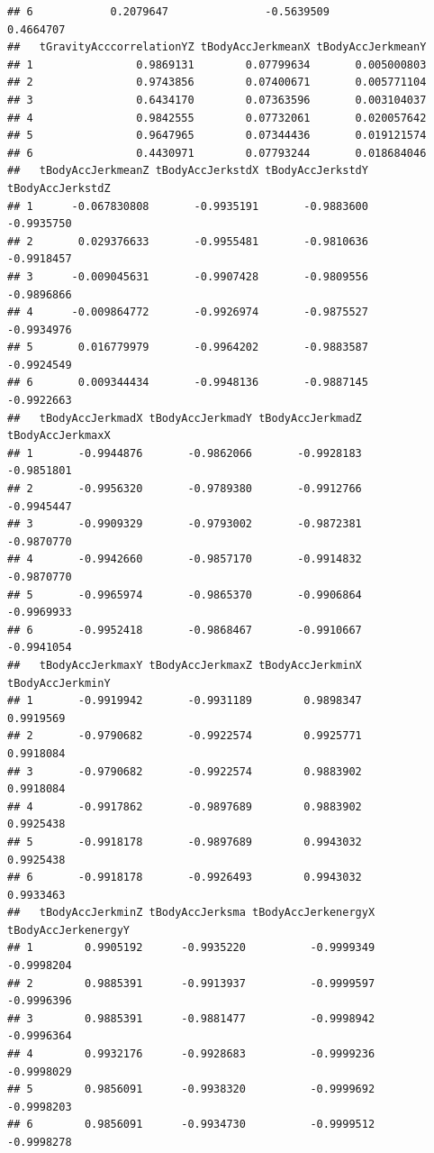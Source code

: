 \documentclass[
]{article}
\begin{document}
\begin{verbatim}
## 6            0.2079647               -0.5639509                0.4664707
##   tGravityAcccorrelationYZ tBodyAccJerkmeanX tBodyAccJerkmeanY
## 1                0.9869131        0.07799634       0.005000803
## 2                0.9743856        0.07400671       0.005771104
## 3                0.6434170        0.07363596       0.003104037
## 4                0.9842555        0.07732061       0.020057642
## 5                0.9647965        0.07344436       0.019121574
## 6                0.4430971        0.07793244       0.018684046
##   tBodyAccJerkmeanZ tBodyAccJerkstdX tBodyAccJerkstdY tBodyAccJerkstdZ
## 1      -0.067830808       -0.9935191       -0.9883600       -0.9935750
## 2       0.029376633       -0.9955481       -0.9810636       -0.9918457
## 3      -0.009045631       -0.9907428       -0.9809556       -0.9896866
## 4      -0.009864772       -0.9926974       -0.9875527       -0.9934976
## 5       0.016779979       -0.9964202       -0.9883587       -0.9924549
## 6       0.009344434       -0.9948136       -0.9887145       -0.9922663
##   tBodyAccJerkmadX tBodyAccJerkmadY tBodyAccJerkmadZ tBodyAccJerkmaxX
## 1       -0.9944876       -0.9862066       -0.9928183       -0.9851801
## 2       -0.9956320       -0.9789380       -0.9912766       -0.9945447
## 3       -0.9909329       -0.9793002       -0.9872381       -0.9870770
## 4       -0.9942660       -0.9857170       -0.9914832       -0.9870770
## 5       -0.9965974       -0.9865370       -0.9906864       -0.9969933
## 6       -0.9952418       -0.9868467       -0.9910667       -0.9941054
##   tBodyAccJerkmaxY tBodyAccJerkmaxZ tBodyAccJerkminX tBodyAccJerkminY
## 1       -0.9919942       -0.9931189        0.9898347        0.9919569
## 2       -0.9790682       -0.9922574        0.9925771        0.9918084
## 3       -0.9790682       -0.9922574        0.9883902        0.9918084
## 4       -0.9917862       -0.9897689        0.9883902        0.9925438
## 5       -0.9918178       -0.9897689        0.9943032        0.9925438
## 6       -0.9918178       -0.9926493        0.9943032        0.9933463
##   tBodyAccJerkminZ tBodyAccJerksma tBodyAccJerkenergyX tBodyAccJerkenergyY
## 1        0.9905192      -0.9935220          -0.9999349          -0.9998204
## 2        0.9885391      -0.9913937          -0.9999597          -0.9996396
## 3        0.9885391      -0.9881477          -0.9998942          -0.9996364
## 4        0.9932176      -0.9928683          -0.9999236          -0.9998029
## 5        0.9856091      -0.9938320          -0.9999692          -0.9998203
## 6        0.9856091      -0.9934730          -0.9999512          -0.9998278

\end{verbatim}
\end{document}
